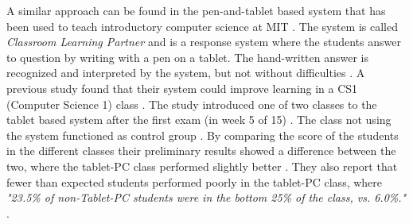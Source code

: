A similar approach can be found in the pen-and-tablet based system that has been used to teach introductory computer science at MIT \cite{koile2007supporting}. The system is called \emph{Classroom Learning Partner} and is a response system where the students answer to question by writing with a pen on a tablet. The hand-written answer is recognized and interpreted by the system, but not without difficulties \cite[pp.~2-3]{koile2007supporting}. A previous study found that their system could improve learning in a CS1 (Computer Science 1) class \cite{koile2006improving}. The study introduced one of two classes to the tablet based system after the first exam (in week 5 of 15) \cite[pp.~6-7]{koile2006improving}. The class not using the system functioned as control group \cite[pp.~6-7]{koile2006improving}. By comparing the score of the students in the different classes their preliminary results showed a difference between the two, where the tablet-PC class performed slightly better \cite{koile2006improving}. They also report that fewer than expected students performed poorly in the tablet-PC class, where \emph{"23.5\% of non-Tablet-PC students were in the bottom 25\% of the class, vs. 6.0\%."} \cite[p.~7]{koile2006improving}. %